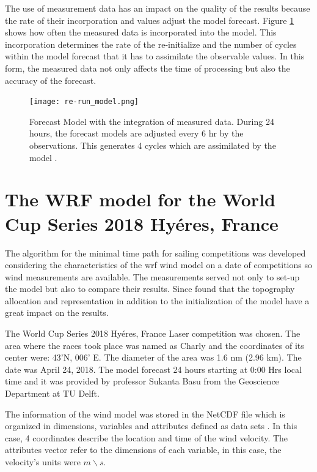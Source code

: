 The use of measurement data has an impact on the quality of the results because the rate of their incorporation and values adjust the model forecast. Figure \ref{fig:data_meas_integration} shows how often the measured data is incorporated into the model. This incorporation determines the rate of the re-initialize and the number of cycles within the model forecast that it has to assimilate the observable values. In this form, the measured data not only affects the time of processing but also the accuracy of the forecast. \par

\begin{figure}
    \centering
    \texttt{[image: re-run\_model.png]}
    \caption{Forecast Model with the integration of measured data. During 24 hours, the forecast models are adjusted every 6 hr by the observations. This generates 4 cycles which are assimilated by the model \cite{warner2010numerical}. }
    \label{fig:data_meas_integration}
\end{figure}

\section{The WRF model for the World Cup Series 2018 Hyéres, France}\label{sec:WRF_WindM_FR}

The algorithm for the minimal time path for sailing competitions was developed considering the characteristics of the \acrshort{wrf} wind model on a date of competitions so wind measurements are available. The measurements served not only to set-up the model but also to compare their results. Since \cite{giannaros2018ultrahigh} found that the topography allocation and representation in addition to the initialization of the model have a great impact on the results. \par

The World Cup Series 2018 Hyéres, France Laser competition was chosen. The area where the races took place was named as Charly and the coordinates of its center were: 43'N, 006' E. The diameter of the area was 1.6 nm (2.96 km). The date was April 24, 2018. The model forecast 24 hours starting at 0:00 Hrs local time and it was provided by professor Sukanta Basu from the Geoscience Department at TU Delft. \par 

The information of the wind model was stored in the NetCDF file which is organized in dimensions, variables and attributes defined as data sets \cite{netcdf56302}. In this case, 4 coordinates describe the location and time of the wind velocity. The attributes vector refer to the dimensions of each variable, in this case, the velocity's units were $m \backslash s $. \par 

